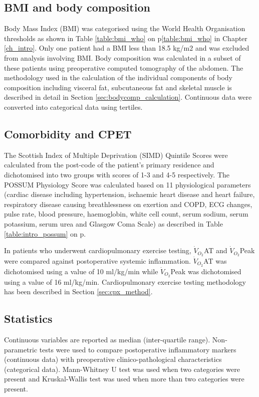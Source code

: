 \subsection{BMI and body composition}
Body Mass Index (BMI) was categorised using the World Health Organisation thresholds as shown in Table \ref{table:bmi_who} on p\ref{table:bmi_who} in Chapter \ref{ch_intro}. 
Only one patient had a BMI less than 18.5 kg/m$2$ and was excluded from analysis involving BMI.
Body composition was calculated in a subset of these patients using preoperative computed tomography of the abdomen. 
The methodology used in the calculation of the individual components of body composition including visceral fat, subcutaneous fat and skeletal muscle is described in detail in Section \ref{sec:bodycomp_calculation}. 
Continuous data were converted into categorical data using tertiles.

\subsection{Comorbidity and CPET}
The Scottish Index of Multiple Deprivation (SIMD) Quintile Scores were calculated from the post-code of the patient's primary residence and dichotomised into two groups with scores of 1-3 and 4-5 respectively.
The POSSUM Physiology Score was calculated based on 11 physiological parameters (cardiac disease including hypertension, ischaemic heart disease and heart failure, respiratory disease causing breathlessness on exertion and COPD, ECG changes, pulse rate, blood pressure, haemoglobin, white cell count, serum sodium, serum potassium, serum urea and Glasgow Coma Scale) as described in Table \ref{table:intro_possum} on p\pageref{table:intro_possum}.

In patients who underwent cardiopulmonary exercise testing, $\dot{V}_{O_2}$AT and $\dot{V}_{O_2}$Peak were compared against postoperative systemic inflammation. 
$\dot{V}_{O_2}$AT was dichotomised using a value of 10 ml/kg/min while $\dot{V}_{O_2}$Peak was dichotomised using a value of 16 ml/kg/min. 
Cardiopulmonary exercise testing methodology has been described in Section \ref{sec:cpx_method}.


\subsection{Statistics}

Continuous variables are reported as median (inter-quartile range).
Non-parametric tests were used to compare postoperative inflammatory markers (continuous data) with preoperative clinico-pathological characteristics (categorical data). 
Mann-Whitney U test was used when two categories were present and Kruskal-Wallis test was used when more than two categories were present.

